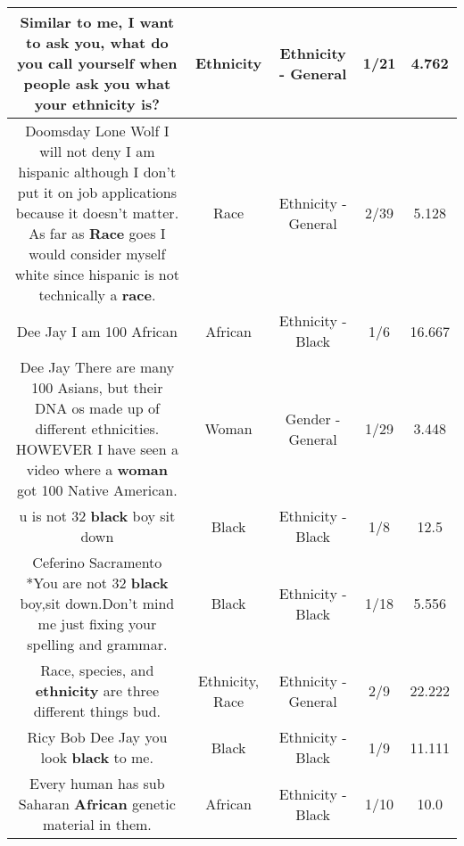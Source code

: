 \documentclass[11pt]{article}
\newlength\mylength
\begin{document}
\begin{center}
\begin{longtable}{|C{.65\mylength}|C{.30\mylength}|C{.12\mylength}|C{.12\mylength}|C{.12\mylength}|}
  \small Similar to me, I want to ask you, what do you call yourself when people ask you what your \textbf{ethnicity} is?\normalsize   & Ethnicity & Ethnicity - General & 1/21 & 4.762 \\  \hline
  \small Doomsday Lone Wolf I will not deny I am hispanic although I don't put it on job applications because it doesn't matter. As far as \textbf{Race} goes I would consider myself white since hispanic is not technically a \textbf{race}.\normalsize   & Race & Ethnicity - General & 2/39 & 5.128 \\  \hline
  \small Dee Jay I am 100 African\normalsize   & African & Ethnicity - Black & 1/6 & 16.667 \\  \hline
  \small Dee Jay There are many 100 Asians, but their DNA os made up of different ethnicities. HOWEVER I have seen a video where a \textbf{woman} got 100 Native American.\normalsize   & Woman & Gender - General & 1/29 & 3.448 \\  \hline
  \small u is not 32 \textbf{black} boy sit down\normalsize   & Black & Ethnicity - Black & 1/8 & 12.5 \\  \hline
  \small Ceferino Sacramento *You are not 32 \textbf{black} boy,sit down.Don't mind me just fixing your spelling and grammar.\normalsize   & Black & Ethnicity - Black & 1/18 & 5.556 \\  \hline
  \small Race, species, and \textbf{ethnicity} are three different things bud.\normalsize   & Ethnicity, Race & Ethnicity - General & 2/9 & 22.222 \\  \hline
  \small Ricy Bob Dee Jay you look \textbf{black} to me.\normalsize   & Black & Ethnicity - Black & 1/9 & 11.111 \\  \hline
  \small Every human has sub Saharan \textbf{African} genetic material in them.\normalsize   & African & Ethnicity - Black & 1/10 & 10.0 \\  \hline

\end{longtable}
\end{center}
\end{document}
